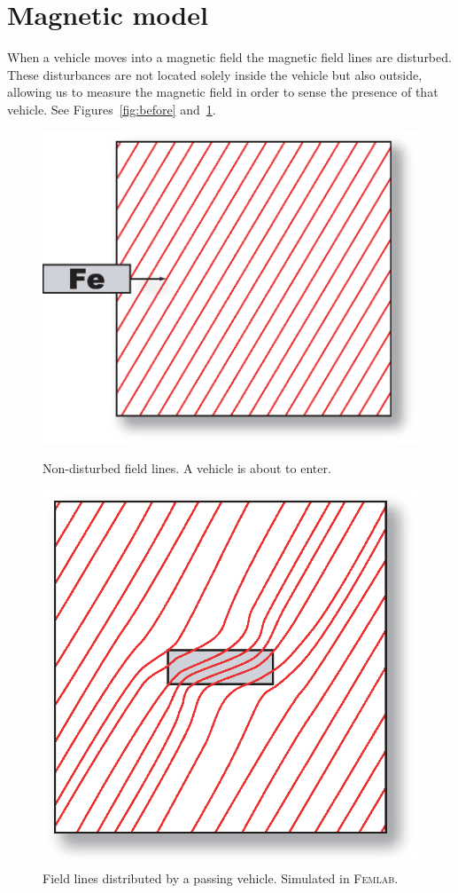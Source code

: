 \section{Magnetic model}

When a vehicle moves into a magnetic field the magnetic field lines are disturbed. These disturbances are not located solely inside the vehicle but also outside, allowing us to measure the magnetic field in order to sense the presence of that vehicle. See Figures~\ref{fig:before} and~\ref{fig:after}.
\begin{subfigures}
\begin{figure}[!th]
 \centering
 \begin{minipage}{0.45\linewidth}
 \centering
 	\includegraphics[height=5 cm]{images/before}
  	\caption[Non-disturbed field lines]{Non-disturbed field lines. A vehicle is about to enter.}
  	\label{fig:before}
 \end{minipage} \hfill
 \begin{minipage}{0.45\linewidth}
 \centering
  	\includegraphics[height=5 cm]{images/after}
  	\caption[Field lines distributed by a vehicle]{Field lines distributed by a passing vehicle. Simulated in \textsc{Femlab}\footnotemark.}
  	\label{fig:after}
 \end{minipage}
  \end{figure}
 \end{subfigures}

%  

